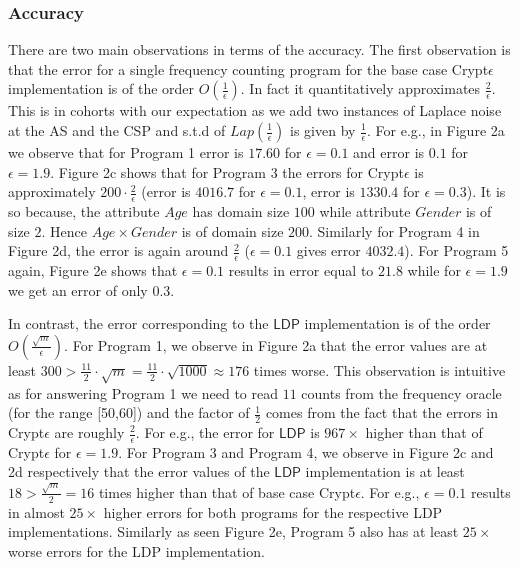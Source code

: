 \subsubsection{Accuracy}
There are two main observations in terms of the accuracy.
The first observation is that the error for a single frequency counting program for the base case Crypt$\epsilon$ implementation is of the order $O(\frac{1}{\epsilon})$. In fact it quantitatively approximates $\frac{2}{\epsilon}$. This is in cohorts with our expectation as we add two instances of Laplace noise at the \textsf{AS} and the \textsf{CSP} and s.t.d of $Lap(\frac{1}{\epsilon})$ is given by $\frac{1}{\epsilon}$. For e.g., in Figure 2a we observe that for Program 1 error is $17.60$ for $\epsilon=0.1$ and   error is $0.1$ for $\epsilon=1.9$. Figure 2c shows that for Program 3 the errors for Crypt$\epsilon$ is approximately $200\cdot\frac{2}{\epsilon}$ (error is $4016.7$ for $\epsilon=0.1$, error is $1330.4$ for $\epsilon=0.3$). It is so because, the attribute $Age$ has domain size $100$ while attribute $Gender$ is of size $2$. Hence $Age\times Gender$ is of domain size $200$. Similarly for Program 4 in Figure 2d, the error is again around $\frac{2}{\epsilon}$ ($\epsilon=0.1$ gives error $4032.4$).  For Program 5 again, Figure 2e shows that  $\epsilon=0.1$ results in error equal to $21.8$ while for $\epsilon=1.9$ we get an error of only $0.3$. \par 
In contrast, the error corresponding to the $\textsf{LDP}$ implementation is of the order $O(\frac{\sqrt{m}}{\epsilon})$. For Program 1, we observe in Figure 2a that the error values are at least $300 >\frac{11}{2}\cdot \sqrt{m}=  \frac{11}{2}\cdot \sqrt{1000} \approx 176$ times worse. This observation is intuitive as for answering Program 1 we need to read $11$  counts from the frequency oracle (for the range [50,60]) and the factor of $\frac{1}{2}$ comes from the fact that the errors in Crypt$\epsilon$ are roughly $\frac{2}{\epsilon}$. For e.g., the error for $\textsf{LDP}$ is $967 \times$  higher than that of Crypt$\epsilon$ for $\epsilon=1.9$. For Program 3 and Program 4, we observe in Figure 2c and 2d respectively that the error values of the $\textsf{LDP}$ implementation is at least $18 >\frac{\sqrt{m}}{2}=16 $ times higher than that of base case Crypt$\epsilon$. For e.g., $\epsilon=0.1$ results in almost $25 \times$ higher errors for both programs for the respective \textsf{LDP} implementations. Similarly as seen Figure 2e, Program 5 also has at least $25\times$ worse errors for the \textsf{LDP} implementation. 
\par

